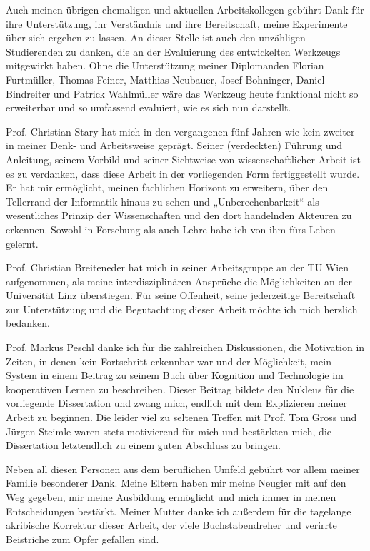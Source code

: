 Auch meinen übrigen ehemaligen und aktuellen Arbeitskollegen gebührt Dank für ihre Unterstützung, ihr Verständnis und ihre Bereitschaft, meine Experimente über sich ergehen zu lassen. An dieser Stelle ist auch den unzähligen Studierenden zu danken, die an der Evaluierung des entwickelten Werkzeugs mitgewirkt haben. Ohne die Unterstützung meiner Diplomanden Florian Furtmüller, Thomas Feiner, Matthias Neubauer, Josef Bohninger, Daniel Bindreiter und Patrick Wahlmüller wäre das Werkzeug heute funktional nicht so erweiterbar und so umfassend evaluiert, wie es sich nun darstellt.

Prof. Christian Stary hat mich in den vergangenen fünf Jahren wie kein zweiter in meiner Denk- und Arbeitsweise geprägt. Seiner (verdeckten) Führung und Anleitung, seinem Vorbild und seiner Sichtweise von wissenschaftlicher Arbeit ist es zu verdanken, dass diese Arbeit in der vorliegenden Form fertiggestellt wurde. Er hat mir ermöglicht, meinen fachlichen Horizont zu erweitern, über den Tellerrand der Informatik hinaus zu sehen und „Unberechenbarkeit“ als wesentliches Prinzip der Wissenschaften und den dort handelnden Akteuren zu erkennen. Sowohl in Forschung als auch Lehre habe ich von ihm fürs Leben gelernt.

Prof. Christian Breiteneder hat mich in seiner Arbeitsgruppe an der TU Wien aufgenommen, als meine interdisziplinären Ansprüche die Möglichkeiten an der Universität Linz überstiegen. Für seine Offenheit, seine jederzeitige Bereitschaft zur Unterstützung und die Begutachtung dieser Arbeit möchte ich mich herzlich bedanken.

Prof. Markus Peschl danke ich für die zahlreichen Diskussionen, die Motivation in Zeiten, in denen kein Fortschritt erkennbar war und der Möglichkeit, mein System in einem Beitrag zu seinem Buch über Kognition und Technologie im kooperativen Lernen zu beschreiben. Dieser Beitrag bildete den Nukleus für die vorliegende Dissertation und zwang mich, endlich mit dem Explizieren meiner Arbeit zu beginnen. Die leider viel zu seltenen Treffen mit Prof. Tom Gross und Jürgen Steimle waren stets motivierend für mich und bestärkten mich, die Dissertation letztendlich zu einem guten Abschluss zu bringen.

Neben all diesen Personen aus dem beruflichen Umfeld gebührt vor allem meiner Familie besonderer Dank. Meine Eltern haben mir meine Neugier mit auf den Weg gegeben, mir meine Ausbildung ermöglicht und mich immer in meinen Entscheidungen bestärkt. Meiner Mutter danke ich außerdem für die tagelange akribische Korrektur dieser Arbeit, der viele Buchstabendreher und verirrte Beistriche zum Opfer gefallen sind.

